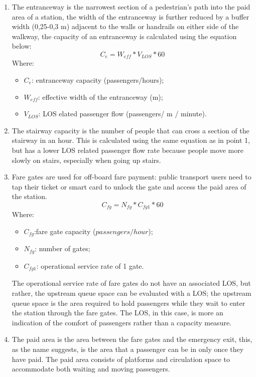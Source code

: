 \documentclass{article}
\begin{document}
\begin{enumerate}
\item  The entranceway is the narrowest section of a pedestrian’s path into the paid area of a station, the width of the entranceway is further reduced by a buffer width (0,25-0,3 m) adjacent to the walls or handrails on either side of the walkway, the capacity of an entranceway is calculated using the equation below:
\begin{equation}
C_e=W_{eff}*V_{LOS}*60
\end{equation}
Where:
\begin{itemize}
\item $C_e$: entranceway capacity (passengers/hours);
\item $W_{eff}$: effective width of the entranceway (m);
\item $V_{LOS}$: LOS elated passenger flow (passengers/ m / minute).
\end{itemize}
\item The stairway capacity is the number of people that can cross a section of the stairway in an hour. This is calculated using the same equation as in point 1, but has a lower LOS related passenger flow rate because people move more slowly on stairs, especially when going up stairs.
\item Fare gates are used for off-board fare payment: public transport users need to tap their ticket or smart card to unlock the gate and access the paid area of the station.
\begin{equation}
C_{fg}=N_{fg}*C_{fg1}*60
\end{equation}
Where:
\begin{itemize}
\item $C_{fg}$:fare gate capacity ($passengers/ hour$);
\item $N_{fg}$: number of gates;
\item $C_{fg1}$: operational service rate of 1 gate.
\end{itemize}
The operational service rate of fare gates do not have an associated LOS, but rather, the upstream queue space can be evaluated with a LOS; the	upstream queue space is the area required to hold passengers while they wait to enter the station through the fare gates. The LOS, in this case, is more an indication of the comfort of passengers rather than a capacity measure. 
\item The paid area is the area between the fare gates and the emergency exit, this, as the name suggests, is the area that a passenger can be in only once they have paid. The paid area consists of platforms and circulation space to accommodate both waiting and moving passengers.\\

\end{enumerate}
\end{document}
